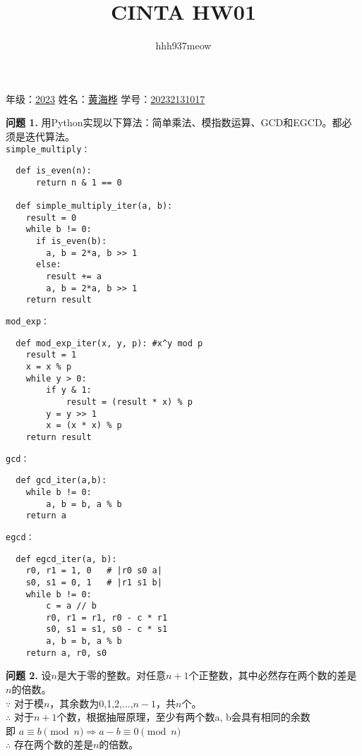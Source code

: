 \documentclass[a4paper]{CINTA}
\title{CINTA HW01}
\author{hhh937meow}
\begin{document}
\maketitle
\begin{center}
    年级：\underline{2023\hspace{1.5cm}} 
    姓名：\underline{黄海桦\hspace{1.5cm}} 
    学号：\underline{20232131017\hspace{1.5cm}} 
\end{center}

\textbf{问题 1.} 用Python实现以下算法：简单乘法、模指数运算、GCD和EGCD。都必须是迭代算法。\\

\texttt{simple\_multiply：}
\begin{verbatim}
  def is_even(n):
      return n & 1 == 0

  def simple_multiply_iter(a, b):
    result = 0
    while b != 0:
      if is_even(b):
        a, b = 2*a, b >> 1
      else:
        result += a
        a, b = 2*a, b >> 1
    return result
\end{verbatim}

\texttt{mod\_exp：}
\begin{verbatim}
  def mod_exp_iter(x, y, p): #x^y mod p
    result = 1
    x = x % p
    while y > 0:
        if y & 1:
            result = (result * x) % p
        y = y >> 1
        x = (x * x) % p
    return result
\end{verbatim}

\texttt{gcd：}
\begin{verbatim}
  def gcd_iter(a,b):
    while b != 0:
        a, b = b, a % b
    return a
\end{verbatim}

\texttt{egcd：}
\begin{verbatim}
  def egcd_iter(a, b):
    r0, r1 = 1, 0   # |r0 s0 a|
    s0, s1 = 0, 1   # |r1 s1 b|
    while b != 0:
        c = a // b
        r0, r1 = r1, r0 - c * r1
        s0, s1 = s1, s0 - c * s1
        a, b = b, a % b
    return a, r0, s0
\end{verbatim}

\textbf{问题 2.} 设$n$是大于零的整数。对任意$n + 1$个正整数，其中必然存在两个数的差是$n$的倍数。\\
$\because$ 对于模$n$，其余数为0,1,2,...,$n-1$，共$n$个。\\
$\therefore$ 对于$n + 1$个数，根据抽屉原理，至少有两个数a, b会具有相同的余数 \\
即 $a \equiv b \pmod{n} \Rightarrow a - b \equiv 0 \pmod{n}$ \\
$\therefore$ 存在两个数的差是$n$的倍数。\\
\end{document}
